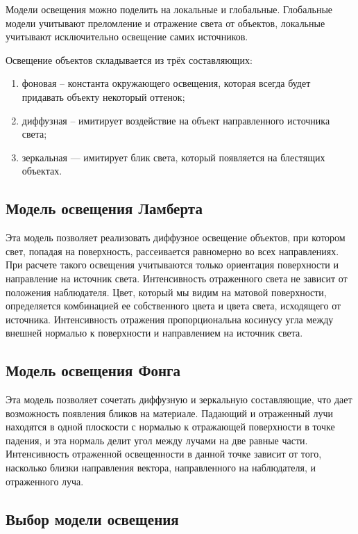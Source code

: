 Модели освещения можно поделить на локальные и глобальные. Глобальные модели учитывают преломление и отражение света от объектов, локальные учитывают исключительно освещение самих источников. 

Освещение объектов складывается из трёх составляющих:

\begin{enumerate}
	\item фоновая -- константа окружающего освещения, которая всегда будет придавать объекту некоторый оттенок; 
	\item диффузная -- имитирует воздействие на объект направленного источника света; 
	\item зеркальная — имитирует блик света, который появляется на блестящих объектах. 
\end{enumerate}

\subsection{Модель освещения Ламберта}

Эта модель позволяет реализовать диффузное освещение объектов, при котором свет, попадая на поверхность, рассеивается равномерно во всех направлениях. При расчете такого освещения учитываются только ориентация поверхности и направление на источник света. Интенсивность отраженного света не зависит от положения наблюдателя. Цвет, который мы видим на матовой поверхности, определяется комбинацией ее собственного цвета и цвета света, исходящего от источника. Интенсивность отражения пропорциональна косинусу угла между внешней нормалью к поверхности и направлением на источник света.

\subsection{Модель освещения Фонга}

Эта модель позволяет сочетать диффузную и зеркальную составляющие, что дает возможность появления бликов на материале. Падающий и отраженный лучи находятся в одной плоскости с нормалью к отражающей поверхности в точке падения, и эта нормаль делит угол между лучами на две равные части. Интенсивность отраженной освещенности в данной точке зависит от того, насколько близки направления вектора, направленного на наблюдателя, и отраженного луча.

\subsection{Выбор модели освещения}

